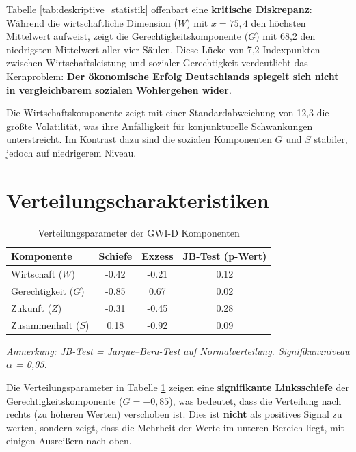 Tabelle \ref{tab:deskriptive_statistik} offenbart eine \textbf{kritische Diskrepanz}: Während die wirtschaftliche Dimension (\(W\)) mit \( \bar{x} = 75{,}4 \) den höchsten Mittelwert aufweist, zeigt die Gerechtigkeitskomponente (\(G\)) mit 68,2 den niedrigsten Mittelwert aller vier Säulen. Diese Lücke von 7,2 Indexpunkten zwischen Wirtschaftsleistung und sozialer Gerechtigkeit verdeutlicht das Kernproblem: \textbf{Der ökonomische Erfolg Deutschlands spiegelt sich nicht in vergleichbarem sozialen Wohlergehen wider}.

Die Wirtschaftskomponente zeigt mit einer Standardabweichung von 12,3 die größte Volatilität, was ihre Anfälligkeit für konjunkturelle Schwankungen unterstreicht. Im Kontrast dazu sind die sozialen Komponenten \(G\) und \(S\) stabiler, jedoch auf niedrigerem Niveau.

\section{Verteilungscharakteristiken}

\begin{table}[ht]
  \centering
  \caption{Verteilungsparameter der GWI-D Komponenten}
  \label{tab:verteilungsparameter}
  \begin{tabular}{lccc}
    \toprule
    \textbf{Komponente} & \textbf{Schiefe} & \textbf{Exzess} & \textbf{JB-Test (p-Wert)} \\
    \midrule
    Wirtschaft (\(W\))          & -0.42 & -0.21 & 0.12 \\
    Gerechtigkeit (\(G\))       & -0.85 &  0.67 & 0.02 \\
    Zukunft (\(Z\))             & -0.31 & -0.45 & 0.28 \\
    Zusammenhalt (\(S\))        &  0.18 & -0.92 & 0.09 \\
    \bottomrule
  \end{tabular}
\end{table}

\begin{flushleft}
\footnotesize{\textit{Anmerkung: JB-Test = Jarque–Bera-Test auf Normalverteilung. Signifikanzniveau $\alpha$ = 0,05.}}
\end{flushleft}

Die Verteilungsparameter in Tabelle \ref{tab:verteilungsparameter} zeigen eine \textbf{signifikante Linksschiefe} der Gerechtigkeitskomponente (\(G = -0{,}85\)), was bedeutet, dass die Verteilung nach rechts (zu höheren Werten) verschoben ist. Dies ist \textbf{nicht} als positives Signal zu werten, sondern zeigt, dass die Mehrheit der Werte im unteren Bereich liegt, mit einigen Ausreißern nach oben. 

